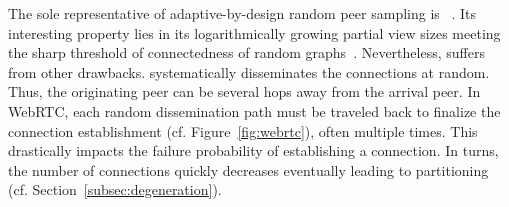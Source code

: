 The sole representative of adaptive-by-design random peer sampling is
\SCAMP~\cite{ganesh2003peer}. Its interesting property lies in its
logarithmically growing partial view sizes meeting the sharp threshold of
connectedness of random graphs~\cite{erdos1959random}. Nevertheless, \SCAMP
suffers from other drawbacks. 
\SCAMP systematically disseminates the connections at random. Thus, the
originating peer can be several hops away from the arrival peer. In WebRTC, each
random dissemination path must be traveled back to finalize the connection
establishment (cf. Figure~\ref{fig:webrtc}), often multiple times. This
drastically impacts the \SCAMP failure probability of establishing a
connection. In turns, the number of connections quickly decreases eventually
leading to partitioning (cf. Section~\ref{subsec:degeneration}).


